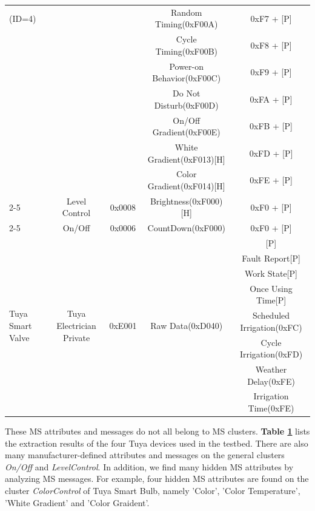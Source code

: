 \documentclass[10pt,journal,compsoc]{IEEEtran}
\begin{document}
\begin{table}[h]
\begin{center}
{\begin{tabular}{l|cccc}
             \quad\quad\;\;(ID=4) & ~ & ~ & Random Timing(0xF00A) & 0xF7 + [P] \\
             ~ & ~ & ~ & Cycle Timing(0xF00B) & 0xF8 + [P]\\
             ~ & ~ & ~ & Power-on Behavior(0xF00C) & 0xF9 + [P]\\
             ~ & ~ & ~ & Do Not Disturb(0xF00D) & 0xFA + [P]\\
             ~ & ~ & ~ & On/Off Gradient(0xF00E) & 0xFB + [P] \\
             ~ & ~ & ~ & White Gradient(0xF013)[H] & 0xFD + [P]\\
             ~ & ~ & ~ & Color Gradient(0xF014)[H] & 0xFE + [P]\\ \cline{2-5}
             ~ & Level Control & 0x0008 & Brightness(0xF000)[H] & 0xF0 + [P] \\ \cline{2-5}
             ~ & On/Off & 0x0006 & CountDown(0xF000) & 0xF0 + [P] \\ \hline
             \multirow{8}{*}{Tuya Smart Valve} & \multirow{8}{*}{Tuya Electrician Private} & \multirow{8}{*}{0xE001} & \multirow{8}{*}{Raw Data(0xD040)} & [P] \\
             ~ & ~ & ~ & ~ & Fault Report[P]\\
             ~ & ~ & ~ & ~ & Work State[P]\\
             ~ & ~ & ~ & ~ & Once Using Time[P]\\
             ~ & ~ & ~ & ~ & Scheduled Irrigation(0xFC)\\
             \quad\quad\;\;(ID=8) & ~ & ~ & ~ & Cycle Irrigation(0xFD)\\
             ~ & ~ & ~ & ~ & Weather Delay(0xFE)\\
             ~ & ~ & ~ & ~ & Irrigation Time(0xFE)\\ \hline
                         
		\end{tabular}
        }
    \end{center}
    \label{table: manufacturer-specific}
    \vspace{0cm}
\end{table}

These MS attributes and messages do not all belong to MS clusters. \textbf{Table \ref{table: manufacturer-specific}} lists the extraction results of the four Tuya devices used in the testbed. There are also many manufacturer-defined attributes and messages on the general clusters \textit{On/Off} and \textit{LevelControl}. In addition, we find many hidden MS attributes by analyzing MS messages. For example, four hidden MS attributes are found on the cluster \textit{ColorControl} of Tuya Smart Bulb, namely 'Color', 'Color Temperature', 'White Gradient' and 'Color Graident'.
\end{document}
